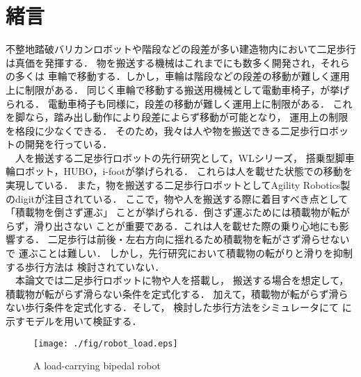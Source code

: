 \section{緒言}
不整地踏破バリカンロボットや階段などの段差が多い建造物内において二足歩行は真価を発揮する．
物を搬送する機械はこれまでにも数多く開発され，それらの多くは
車輪で移動する．しかし，車輪は階段などの段差の移動が難しく運用上に制限がある．
同じく車輪で移動する搬送用機械として電動車椅子\cite{refer5}，\cite{refer6}が挙げられる．
電動車椅子も同様に，段差の移動が難しく運用上に制限がある．
これを脚なら，踏み出し動作により段差によらず移動が可能となり，
運用上の制限を格段に少なくできる．
そのため，我々は人や物を搬送できる二足歩行ロボットの開発を行っている\cite{refer9}．\\
　人を搬送する二足歩行ロボットの先行研究として，WLシリーズ\cite{refer1}，
搭乗型脚車輪ロボット\cite{refer2}，HUBO\cite{refer3}，i-foot\cite{refer7}が挙げられる．
これらは人を載せた状態での移動を実現している．
また，物を搬送する二足歩行ロボットとしてAgility
Robotics製のdigit\cite{refer4}が注目されている．
ここで，物や人を搬送する際に着目すべき点として「積載物を倒さず運ぶ」
ことが挙げられる．倒さず運ぶためには積載物が転がらず，滑り出さない
ことが重要である．これは人を載せた際の乗り心地にも影響する．
二足歩行は前後・左右方向に揺れるため積載物を転がさず滑らせないで
運ぶことは難しい．
しかし，先行研究において積載物の転がりと滑りを抑制する歩行方法は
検討されていない．\\
　本論文では二足歩行ロボットに物や人を搭載し，
搬送する場合を想定して，積載物が転がらず滑らない条件を定式化する．
加えて，積載物が転がらず滑らない歩行条件を定式化する．そして，
検討した歩行方法をシミュレータにて
に示すモデルを用いて検証する．
\begin{figure}[t]
    \begin{center}
    \texttt{[image: ./fig/robot\_load.eps]}
    \caption{A load-carrying bipedal robot}
  \end{center}
\end{figure}


